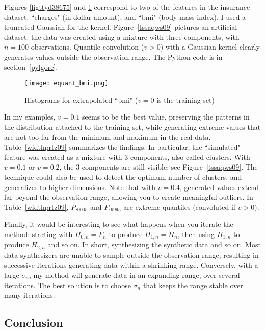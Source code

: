 \documentclass[oneside,10pt]{book}
\begin{document}
Figures \ref{figttyd38675} and  \ref{fig:pif65lkh} correspond to two of the features in the insurance dataset: ``charges" (in dollar amount), and ``bmi" (body mass index). I used a truncated Gaussian for the kernel. 
Figure~\ref{tssaqws09} pictures an artificial dataset: the data was created using a mixture with three components, with $n=100$ observations. Quantile convolution ($v>0$) with a Gaussian kernel clearly generates values  outside the observation range. The Python code is in section~\ref{pylgore}.




\begin{figure}[H]
\centering
\texttt{[image: equant\_bmi.png]}  
\caption{Histograms for extrapolated ``bmi" ($v=0$ is the training set)}
\label{fig:pif65lkh}
\end{figure}

In my examples, $v=0.1$ seems to be the best value, preserving the patterns in the distribution attached to the training set, while generating extreme values that are not too far from the minimum and maximum in 
 the real data. Table~\ref{widthprtz09} summarizes the findings. In particular, the ``simulated" feature
 was created as a mixture with 3 components, also called clusters. With $v=0.1$ or $v=0.2$, the 3 components are still visible: see Figure~\ref{tssaqws09}. 
The technique could also be used to detect the optimum number of clusters, and generalizes to higher dimensions. Note that with $v=0.4$, generated values extend far beyond the observation range, allowing
 you to create meaningful outliers. In Table~\ref{widthprtz09}, $P._{0005}$ and
 $P._{9995}$ are extreme quantiles (convoluted if $v>0$).

Finally, it would be interesting to see what happens when you iterate the method: starting 
with $H_{0,n} =F_n$ to produce $H_{1,n}=H_n$, then using $H_{1,n}$ to produce
  $H_{2,n}$ and so on. In short, synthesizing the synthetic data and so on. Most data synthesizers are unable to sample outside the observation range, resulting 
 in successive iterations generating data within a shrinking range. Conversely, with a large $\sigma_n$, my method will generate data in an expanding range, over several iterations.  The best solution is to choose $\sigma_n$ that keeps the range stable over many iterations. 




\subsection{Conclusion}
\end{document}
